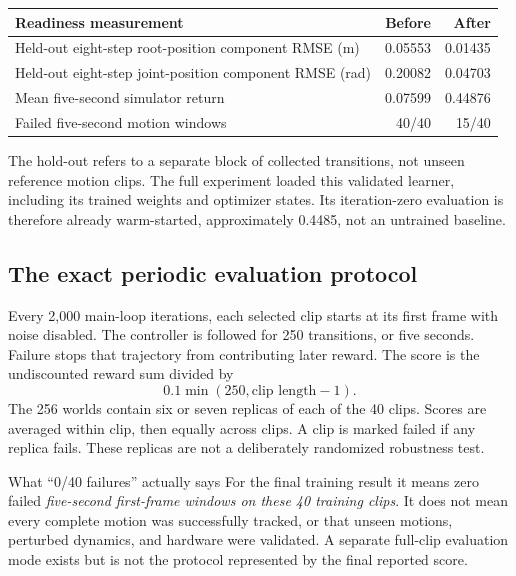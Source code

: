 \documentclass[11pt,a4paper]{article}
\begin{document}
\begin{center}
\begin{tabularx}{\linewidth}{@{}Xrr@{}}
\toprule
Readiness measurement & Before & After\\
\midrule
Held-out eight-step root-position component RMSE (m) & 0.05553 & 0.01435\\
Held-out eight-step joint-position component RMSE (rad) & 0.20082 & 0.04703\\
Mean five-second simulator return & 0.07599 & 0.44876\\
Failed five-second motion windows & 40/40 & 15/40\\
\bottomrule
\end{tabularx}
\end{center}
The hold-out refers to a separate block of collected transitions, not unseen
reference motion clips. The full experiment loaded this validated learner,
including its trained weights and optimizer states. Its iteration-zero evaluation
is therefore already warm-started, approximately 0.4485, not an untrained baseline.

\subsection{The exact periodic evaluation protocol}
Every 2,000 main-loop iterations, each selected clip starts at its first frame
with noise disabled. The controller is followed for 250 transitions, or five
seconds. Failure stops that trajectory from contributing later reward. The score
is the undiscounted reward sum divided by
\begin{equation}
0.1\min(250,\text{clip length}-1).
\end{equation}
The 256 worlds contain six or seven replicas of each of the 40 clips. Scores
are averaged within clip, then equally across clips. A clip is marked failed
if any replica fails. These replicas are not a deliberately randomized robustness
test.

\begin{caution}{What ``0/40 failures'' actually says}
For the final training result it means zero failed \emph{five-second first-frame
windows on these 40 training clips}. It does not mean every complete motion was
successfully tracked, or that unseen motions, perturbed dynamics, and hardware
were validated. A separate full-clip evaluation mode exists but is not the
protocol represented by the final reported score.
\end{caution}
\end{document}
